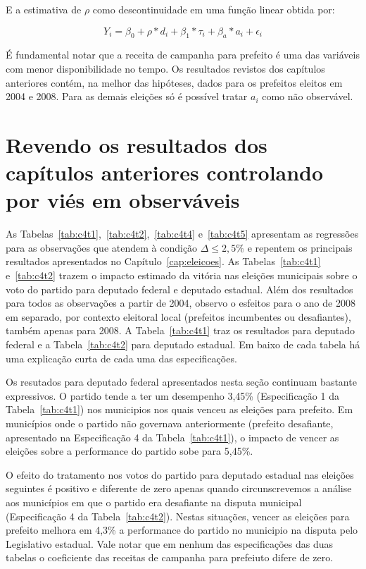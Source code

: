 E a estimativa de $\rho$ como descontinuidade em uma função linear obtida por:

\[Y_{i}=\beta_{0}+\rho*d_{i}+\beta_{1}*\tau_{i}+\beta_{a}*a_{i}+\epsilon_{i}\]


É fundamental notar que a receita de campanha para prefeito é uma das variáveis com menor disponibilidade no tempo. Os resultados revistos dos capítulos anteriores contém, na melhor das hipóteses, dados para os prefeitos eleitos em 2004 e 2008. Para as demais eleições só é possível tratar $a_{i}$ como não observável.

\section{Revendo os resultados dos capítulos anteriores controlando por viés em observáveis}

As Tabelas~\ref{tab:c4t1},~\ref{tab:c4t2},~\ref{tab:c4t4} e~\ref{tab:c4t5} apresentam as regressões para as observações que atendem à condição $\Delta \leq 2,5\%$ e repentem os principais resultados apresentados no Capítulo~\ref{cap:eleicoes}. As Tabelas~\ref{tab:c4t1} e~\ref{tab:c4t2} trazem o impacto estimado da vitória nas eleições municipais sobre o voto do partido para deputado federal e deputado estadual. Além dos resultados para todos as observações a partir de 2004, observo o esfeitos para o ano de 2008 em separado, por contexto eleitoral local (prefeitos incumbentes ou desafiantes), também apenas para 2008. A Tabela~\ref{tab:c4t1} traz os resultados para deputado federal e a Tabela~\ref{tab:c4t2} para deputado estadual. Em baixo de cada tabela há uma explicação curta de cada uma das especificações.



%

Os resutados para deputado federal apresentados nesta seção continuam bastante expressivos. O partido tende a ter um desempenho 3,45\% (Especificação 1 da Tabela~\ref{tab:c4t1}) nos municipios nos quais venceu as eleições para prefeito. Em municípios onde o partido não governava anteriormente (prefeito desafiante, apresentado na Especificação 4 da Tabela~\ref{tab:c4t1}), o impacto de vencer as eleições sobre a performance do partido sobe para 5,45\%.

O efeito do tratamento nos votos do partido para deputado estadual nas eleições seguintes é positivo e diferente de zero apenas quando circunscrevemos a análise aos municípios em que o partido era desafiante na disputa municipal (Especificação 4 da Tabela~\ref{tab:c4t2}). Nestas situações, vencer as eleições para prefeito melhora em 4,3\% a performance do partido no municipio na disputa pelo Legislativo estadual. Vale notar que em nenhum das especificações das duas tabelas o coeficiente das receitas de campanha para prefeiuto difere de zero.

